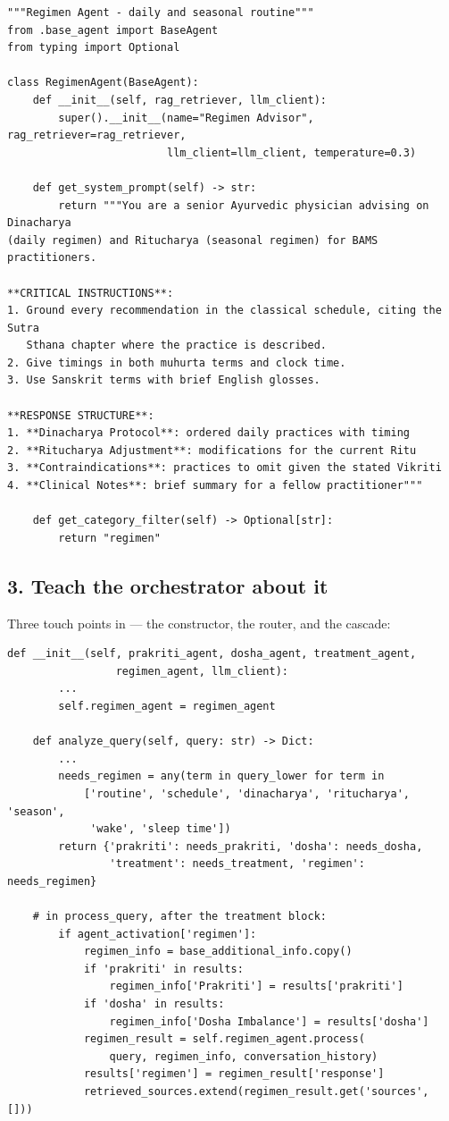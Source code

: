 \begin{lstlisting}[style=py]
"""Regimen Agent - daily and seasonal routine"""
from .base_agent import BaseAgent
from typing import Optional

class RegimenAgent(BaseAgent):
    def __init__(self, rag_retriever, llm_client):
        super().__init__(name="Regimen Advisor", rag_retriever=rag_retriever,
                         llm_client=llm_client, temperature=0.3)

    def get_system_prompt(self) -> str:
        return """You are a senior Ayurvedic physician advising on Dinacharya
(daily regimen) and Ritucharya (seasonal regimen) for BAMS practitioners.

**CRITICAL INSTRUCTIONS**:
1. Ground every recommendation in the classical schedule, citing the Sutra
   Sthana chapter where the practice is described.
2. Give timings in both muhurta terms and clock time.
3. Use Sanskrit terms with brief English glosses.

**RESPONSE STRUCTURE**:
1. **Dinacharya Protocol**: ordered daily practices with timing
2. **Ritucharya Adjustment**: modifications for the current Ritu
3. **Contraindications**: practices to omit given the stated Vikriti
4. **Clinical Notes**: brief summary for a fellow practitioner"""

    def get_category_filter(self) -> Optional[str]:
        return "regimen"
\end{lstlisting}

\subsection{3. Teach the orchestrator about it}

Three touch points in  --- the constructor, the router, and the cascade:

\begin{lstlisting}[style=py]
    def __init__(self, prakriti_agent, dosha_agent, treatment_agent,
                 regimen_agent, llm_client):
        ...
        self.regimen_agent = regimen_agent

    def analyze_query(self, query: str) -> Dict:
        ...
        needs_regimen = any(term in query_lower for term in
            ['routine', 'schedule', 'dinacharya', 'ritucharya', 'season',
             'wake', 'sleep time'])
        return {'prakriti': needs_prakriti, 'dosha': needs_dosha,
                'treatment': needs_treatment, 'regimen': needs_regimen}

    # in process_query, after the treatment block:
        if agent_activation['regimen']:
            regimen_info = base_additional_info.copy()
            if 'prakriti' in results:
                regimen_info['Prakriti'] = results['prakriti']
            if 'dosha' in results:
                regimen_info['Dosha Imbalance'] = results['dosha']
            regimen_result = self.regimen_agent.process(
                query, regimen_info, conversation_history)
            results['regimen'] = regimen_result['response']
            retrieved_sources.extend(regimen_result.get('sources', []))
\end{lstlisting}

